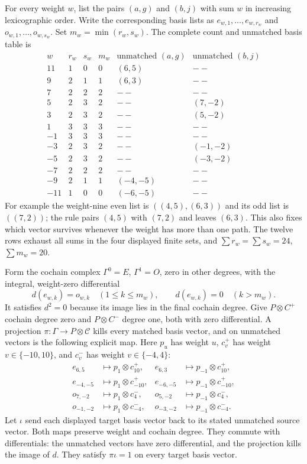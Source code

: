 For every weight $w$, list the pairs $(a,g)$ and $(b,j)$ with sum $w$
in increasing lexicographic order. Write the corresponding basis lists
as $e_{w,1},\ldots,e_{w,r_w}$ and $o_{w,1},\ldots,o_{w,s_w}$.
Set $m_w=\min(r_w,s_w)$. The complete count and unmatched basis table is
\[
\begin{array}{r|rrr|c|c}
 w&r_w&s_w&m_w&\text{unmatched }(a,g)&\text{unmatched }(b,j)\\\hline
 11&1&0&0&(6,5)&--\\
 9&2&1&1&(6,3)&--\\
 7&2&2&2&--&--\\
 5&2&3&2&--&(7,-2)\\
 3&2&3&2&--&(5,-2)\\
 1&3&3&3&--&--\\
 -1&3&3&3&--&--\\
 -3&2&3&2&--&(-1,-2)\\
 -5&2&3&2&--&(-3,-2)\\
 -7&2&2&2&--&--\\
 -9&2&1&1&(-4,-5)&--\\
 -11&1&0&0&(-6,-5)&--
\end{array}
\]
For example the weight-nine even list is
$((4,5),(6,3))$ and its odd list is $((7,2))$; the rule pairs
$(4,5)$ with $(7,2)$ and leaves $(6,3)$. This also fixes which vector
survives whenever the weight has more than one path. The twelve rows
exhaust all sums in the four displayed finite sets, and
$\sum r_w=\sum s_w=24$, $\sum m_w=20$.

Form the cochain complex $\Gamma^0=E$, $\Gamma^1=O$, zero in other
degrees, with the integral, weight-zero differential
\begin{equation}\label{eq:fgb-cancel-differential}
 d(e_{w,k})=o_{w,k}\quad(1\leq k\leq m_w),\qquad
 d(e_{w,k})=0\quad(k>m_w).
\end{equation}
It satisfies $d^2=0$ because its image lies in the final cochain degree.
Give $P\otimes C^+$ cochain degree zero and $P\otimes C^-$ degree one,
both with zero differential. A projection $\pi:\Gamma\to P\otimes
\mathcal C$ kills every matched basis vector, and on unmatched vectors
is the following explicit map. Here $p_u$ has weight $u$, $c_v^+$ has
weight $v\in\{-10,10\}$, and $c_v^-$ has weight
$v\in\{-4,4\}$:
\begin{align*}
 e_{6,5}&\longmapsto p_1\otimes c_{10}^+,&
 e_{6,3}&\longmapsto p_{-1}\otimes c_{10}^+,\\
 e_{-4,-5}&\longmapsto p_1\otimes c_{-10}^+,&
 e_{-6,-5}&\longmapsto p_{-1}\otimes c_{-10}^+,\\
 o_{7,-2}&\longmapsto p_1\otimes c_4^-,&
 o_{5,-2}&\longmapsto p_{-1}\otimes c_4^-,\\
 o_{-1,-2}&\longmapsto p_1\otimes c_{-4}^-,&
 o_{-3,-2}&\longmapsto p_{-1}\otimes c_{-4}^-.
\end{align*}
Let $\iota$ send each displayed target basis vector back to its stated
unmatched source vector. Both maps preserve weight and cochain degree.
They commute with differentials: the unmatched vectors have zero
differential, and the projection kills the image of $d$. They satisfy
$\pi\iota=1$ on every target basis vector.

